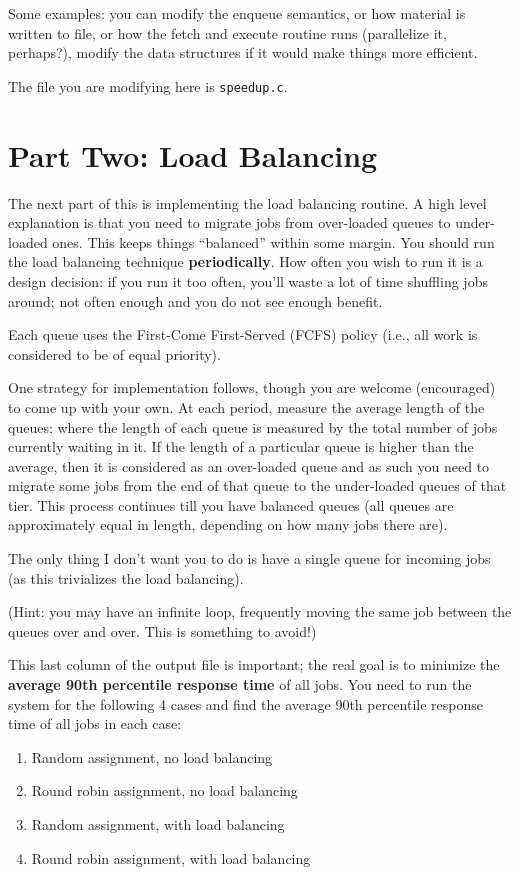 \documentclass[letterpaper,10pt]{article}
\begin{document}
Some examples: you can modify the enqueue semantics, or how material is written to file, or how the fetch and execute routine runs (parallelize it, perhaps?), modify the data structures if it would make things more efficient.

The file you are modifying here is \texttt{speedup.c}.


\section*{Part Two: Load Balancing}
The next part of this is implementing the load balancing routine. A high level explanation is that you need to migrate jobs from over-loaded queues to under-loaded ones. This keeps things ``balanced'' within some margin. You should run the load balancing technique \textbf{periodically}. How often you wish to run it is a design decision: if you run it too often, you'll waste a lot of time shuffling jobs around; not often enough and you do not see enough benefit.

Each queue uses the First-Come First-Served (FCFS) policy (i.e., all work is considered to be of equal priority).

One strategy for implementation follows, though you are welcome (encouraged) to come up with your own. At each period, measure the average length of the queues; where the length of each queue is measured by the total number of jobs currently waiting in it. If the length of a particular queue is higher than the average, then it is considered as an over-loaded queue and as such you need to migrate some jobs from the end of that queue to the under-loaded queues of that tier. This process continues till you have balanced queues (all queues are approximately equal in length, depending on how many jobs there are).

The only thing I don't want you to do is have a single queue for incoming jobs (as this trivializes the load balancing).

(Hint: you may have an infinite loop, frequently moving the same job between the queues over and over. This is something to avoid!)

This last column of the output file is important; the real goal is to minimize the \textbf{average 90th percentile response time} of all jobs. You need to run the system for the following 4 cases and find the average 90th percentile response time of all jobs in each case:

\begin{enumerate}
	\item Random assignment, no load balancing
	\item Round robin assignment, no load balancing
	\item Random assignment, with load balancing
	\item Round robin assignment, with load balancing
\end{enumerate}
\end{document}
